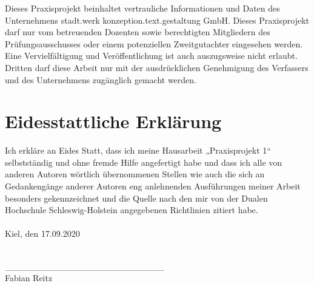 \documentclass[a4paper]{scrartcl}
\begin{document}
Dieses Praxisprojekt beinhaltet vertrauliche Informationen und Daten des Unternehmens stadt.werk konzeption.text.gestaltung GmbH. Dieses Praxisprojekt darf nur vom betreuenden Dozenten sowie berechtigten Mitgliedern des Prüfungsausschusses oder einem potenziellen Zweitgutachter eingesehen werden. Eine Vervielfältigung und Veröffentlichung ist auch auszugsweise nicht erlaubt. Dritten darf diese Arbeit nur mit der ausdrücklichen Genehmigung des Verfassers und des Unternehmens zugänglich gemacht werden.

\vspace{8cm}

\section*{Eidesstattliche Erklärung}


\onehalfspacing

Ich erkläre an Eides Statt, dass ich meine Hausarbeit „Praxisprojekt 1“ selbstständig und ohne fremde Hilfe angefertigt habe und dass ich alle von anderen Autoren wörtlich übernommenen Stellen wie auch die sich an Gedankengänge anderer Autoren eng anlehnenden Ausführungen meiner Arbeit besonders gekennzeichnet und die Quelle nach den mir von der Dualen Hochschule Schleswig-Holstein angegebenen Richtlinien zitiert habe. \\ \\

Kiel, den 17.09.2020 \\ \\ 

\begin{tabbing}
	\_\_\_\_\_\_\_\_\_\_\_\_\_\_\_\_\_\_\_\_\_\_\_\_\_ \\
	Fabian Reitz
\end{tabbing}
\end{document}
